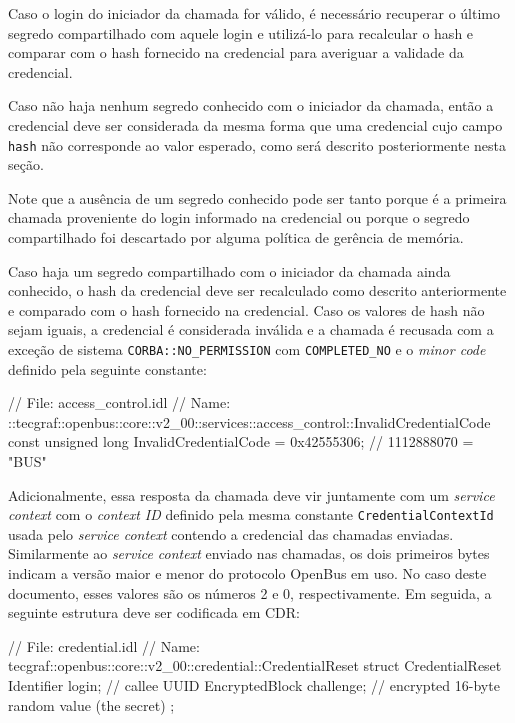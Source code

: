 \documentclass[]{article}
\newcommand{\term}[1]{\textit{#1}}
\newcommand{\code}[1]{\texttt{#1}}
\begin{document}
Caso o login do iniciador da chamada for válido, é necessário recuperar o último segredo compartilhado com aquele login e utilizá-lo para recalcular o hash e comparar com o hash fornecido na credencial para averiguar a validade da credencial.

Caso não haja nenhum segredo conhecido com o iniciador da chamada, então a credencial deve ser considerada da mesma forma que uma credencial cujo campo \code{hash} não corresponde ao valor esperado, como será descrito posteriormente nesta seção.

Note que a ausência de um segredo conhecido pode ser tanto porque é a primeira chamada proveniente do login informado na credencial ou porque o segredo compartilhado foi descartado por alguma política de gerência de memória.

Caso haja um segredo compartilhado com o iniciador da chamada ainda conhecido, o hash da credencial deve ser recalculado como descrito anteriormente e comparado com o hash fornecido na credencial.
Caso os valores de hash não sejam iguais, a credencial é considerada inválida e a chamada é recusada com a exceção de sistema \code{CORBA::NO\_PERMISSION} com \code{COMPLETED\_NO} e o \term{minor code} definido pela seguinte constante:

\begin{samplecode}[language={[CORBA]idl}]
// File: access_control.idl
// Name: ::tecgraf::openbus::core::v2_00::services::access_control::InvalidCredentialCode
const unsigned long InvalidCredentialCode = 0x42555306; // 1112888070 = "BUS\6"
\end{samplecode}

Adicionalmente, essa resposta da chamada deve vir juntamente com um \term{service context} com o \term{context ID} definido pela mesma constante \code{CredentialContextId} usada pelo \term{service context} contendo a credencial das chamadas enviadas.
Similarmente ao \term{service context} enviado nas chamadas, os dois primeiros bytes indicam a versão maior e menor do protocolo OpenBus em uso.
No caso deste documento, esses valores são os números 2 e 0, respectivamente.
Em seguida, a seguinte estrutura deve ser codificada em CDR:

\begin{samplecode}[language={[CORBA]idl}]
// File: credential.idl
// Name: tecgraf::openbus::core::v2_00::credential::CredentialReset
struct CredentialReset {
	Identifier login;         // callee UUID
	EncryptedBlock challenge; // encrypted 16-byte random value (the secret)
};
\end{samplecode}
\end{document}
